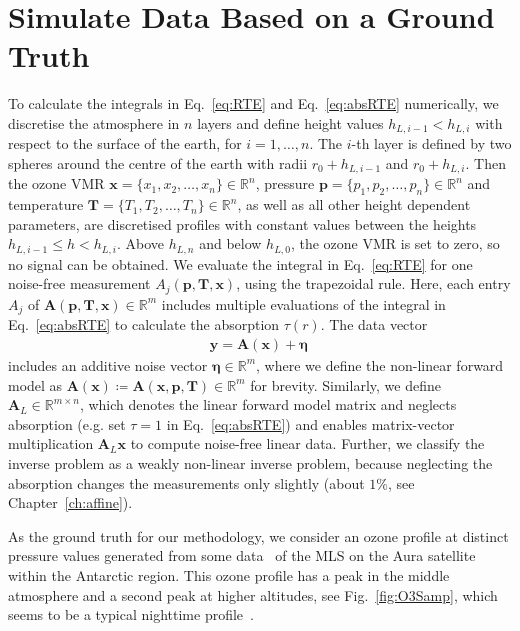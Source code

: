\section{Simulate Data Based on a Ground Truth}
\label{sec:SimDat}
To calculate the integrals in Eq.~\ref{eq:RTE} and Eq.~\ref{eq:absRTE} numerically, we discretise the atmosphere in $n$ layers and define height values $h_{L,i-1} < h_{L,i}$ with respect to the surface of the earth, for $i = 1, \dots, n$.
The $i$-th layer is defined by two spheres around the centre of the earth with radii $ r_0 + h_{L,i-1} $ and $r_0 + h_{L,i}$.
Then the ozone VMR $\bm{x} =\{x_1,x_2,\ldots,x_n\} \in \mathbb{R}^{n}$, pressure $\bm{p} =\{p_1,p_2,\ldots,p_n\} \in \mathbb{R}^{n}$ and temperature $\bm{T} =\{T_1,T_2,\ldots,T_n\} \in \mathbb{R}^{n}$, as well as all other height dependent parameters, are discretised profiles with constant values between the heights $h_{L,i-1} \leq h < h_{L,i}$.
Above $h_{L, n}$ and below $h_{L,0} $, the ozone VMR is set to zero, so no signal can be obtained.
We evaluate the integral in Eq.~\eqref{eq:RTE} for one noise-free measurement $A_{j}(\bm{p},\bm{T},\bm{x})$, using the trapezoidal rule.
Here, each entry $A_{j}$ of $\bm{A}(\bm{p},\bm{T},\bm{x})\in \mathbb{R}^{m}$ includes multiple evaluations of the integral in Eq.~\ref{eq:absRTE} to calculate the absorption $\tau(r)$.
The data vector
\begin{align}
	\bm{y} = \bm{A}(\bm{x}) + \bm{\eta}\, 
\end{align}
includes an additive noise vector $\bm{\eta} \in \mathbb{R}^{m}$, where we define the non-linear forward model as $\bm{A}(\bm{x}) \coloneqq \bm{A}(\bm{x},  \bm{p},\bm{T})   \in \mathbb{R}^{m}$ for brevity.
Similarly, we define $\bm{A}_L\in \mathbb{R}^{m\times n}$, which denotes the linear forward model matrix and neglects absorption (e.g. set $\tau = 1$ in Eq.~\eqref{eq:absRTE}) and enables matrix-vector multiplication $\bm{A}_L \bm{x}$ to compute noise-free linear data.
Further, we classify the inverse problem as a weakly non-linear inverse problem, because neglecting the absorption changes the measurements only slightly (about $1\%$, see Chapter~\ref{ch:affine}).

As the ground truth for our methodology, we consider an ozone profile at distinct pressure values generated from some data~\cite{MLSdata} of the MLS on the Aura satellite within the Antarctic region.
This ozone profile has a peak in the middle atmosphere and a second peak at higher altitudes, see Fig.~\ref{fig:O3Samp}, which seems to be a typical nighttime profile~\cite{Lee2020NightOzone}.


